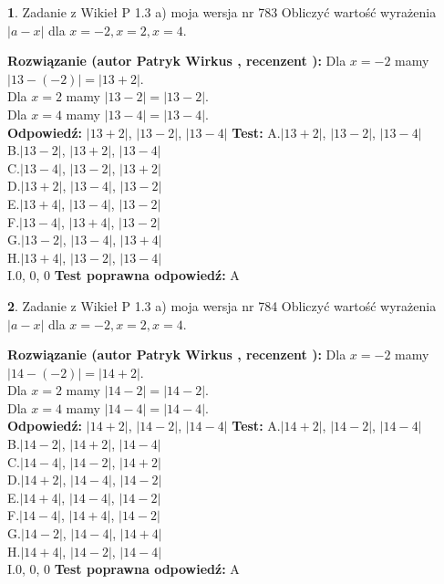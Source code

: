 \documentclass[12pt, a4paper]{article}
\theoremstyle{definition} %
\newtheorem{zad}{}
\newcommand{\zadStart}[1]{\begin{zad}#1\newline}
\newcommand{\zadStop}{\end{zad}}
\newcommand{\rozwStart}[2]{\noindent \textbf{Rozwiązanie (autor #1 , recenzent #2): }\newline}
\newcommand{\rozwStop}{\newline}
\newcommand{\odpStart}{\noindent \textbf{Odpowiedź:}\newline}
\newcommand{\odpStop}{\newline}
\newcommand{\testStart}{\noindent \textbf{Test:}\newline}
\newcommand{\testStop}{\newline}
\newcommand{\kluczStart}{\noindent \textbf{Test poprawna odpowiedź:}\newline}
\newcommand{\kluczStop}{\newline}
\begin{document}
\zadStart{Zadanie z Wikieł P 1.3 a) moja wersja nr 783}
Obliczyć wartość wyrażenia $|a - x|$ dla $x=-2,x=2,x=4$.
\zadStop
\rozwStart{Patryk Wirkus}{}
Dla $x = -2$ mamy $|13 - (-2)| = |13 + 2|$.\\
Dla $x = 2$ mamy $|13 - 2| = |13 - 2|$.\\
Dla $x = 4$ mamy $|13 - 4| = |13 - 4|$.\\
\rozwStop
\odpStart
$|13 + 2|$, $|13 - 2|$, $|13 - 4|$
\odpStop
\testStart
A.$|13 + 2|$, $|13 - 2|$, $|13 - 4|$\\
B.$|13 - 2|$, $|13 + 2|$, $|13 - 4|$\\
C.$|13 - 4|$, $|13 - 2|$, $|13 + 2|$\\
D.$|13 + 2|$, $|13 - 4|$, $|13 - 2|$\\
E.$|13 + 4|$, $|13 - 4|$, $|13 - 2|$\\
F.$|13 - 4|$, $|13 + 4|$, $|13 - 2|$\\
G.$|13 - 2|$, $|13 - 4|$, $|13 + 4|$\\
H.$|13 + 4|$, $|13 - 2|$, $|13 - 4|$\\
I.$0$, $0$, $0$
\testStop
\kluczStart
A
\kluczStop



\zadStart{Zadanie z Wikieł P 1.3 a) moja wersja nr 784}
Obliczyć wartość wyrażenia $|a - x|$ dla $x=-2,x=2,x=4$.
\zadStop
\rozwStart{Patryk Wirkus}{}
Dla $x = -2$ mamy $|14 - (-2)| = |14 + 2|$.\\
Dla $x = 2$ mamy $|14 - 2| = |14 - 2|$.\\
Dla $x = 4$ mamy $|14 - 4| = |14 - 4|$.\\
\rozwStop
\odpStart
$|14 + 2|$, $|14 - 2|$, $|14 - 4|$
\odpStop
\testStart
A.$|14 + 2|$, $|14 - 2|$, $|14 - 4|$\\
B.$|14 - 2|$, $|14 + 2|$, $|14 - 4|$\\
C.$|14 - 4|$, $|14 - 2|$, $|14 + 2|$\\
D.$|14 + 2|$, $|14 - 4|$, $|14 - 2|$\\
E.$|14 + 4|$, $|14 - 4|$, $|14 - 2|$\\
F.$|14 - 4|$, $|14 + 4|$, $|14 - 2|$\\
G.$|14 - 2|$, $|14 - 4|$, $|14 + 4|$\\
H.$|14 + 4|$, $|14 - 2|$, $|14 - 4|$\\
I.$0$, $0$, $0$
\testStop
\kluczStart
A
\kluczStop
\end{document}
